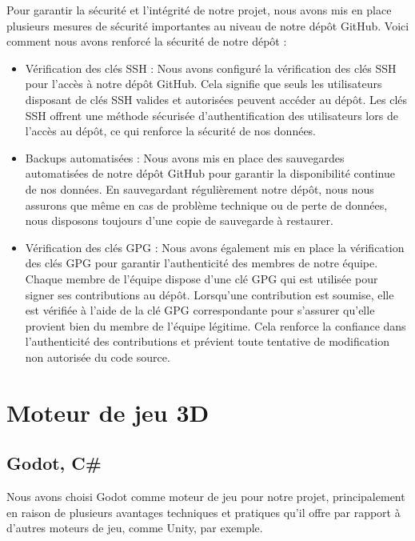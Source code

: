 \documentclass[
	article,			%
	11pt,				%
	oneside,			%
	a4paper,			%
	chapter=TITLE,
	french,			%
	sumario=tradicional
	]{base_nt}
\begin{document}
Pour garantir la sécurité et l'intégrité de notre projet, nous avons mis en place plusieurs mesures de sécurité importantes au niveau de notre dépôt GitHub. Voici comment nous avons renforcé la sécurité de notre dépôt :

\begin{itemize}
    \item Vérification des clés SSH : Nous avons configuré la vérification des clés SSH pour l'accès à notre dépôt GitHub. Cela signifie que seuls les utilisateurs disposant de clés SSH valides et autorisées peuvent accéder au dépôt. Les clés SSH offrent une méthode sécurisée d'authentification des utilisateurs lors de l'accès au dépôt, ce qui renforce la sécurité de nos données.
    \item Backups automatisées : Nous avons mis en place des sauvegardes automatisées de notre dépôt GitHub pour garantir la disponibilité continue de nos données. En sauvegardant régulièrement notre dépôt, nous nous assurons que même en cas de problème technique ou de perte de données, nous disposons toujours d'une copie de sauvegarde à restaurer.
    \item Vérification des clés GPG : Nous avons également mis en place la vérification des clés GPG pour garantir l'authenticité des membres de notre équipe. Chaque membre de l'équipe dispose d'une clé GPG qui est utilisée pour signer ses contributions au dépôt. Lorsqu'une contribution est soumise, elle est vérifiée à l'aide de la clé GPG correspondante pour s'assurer qu'elle provient bien du membre de l'équipe légitime. Cela renforce la confiance dans l'authenticité des contributions et prévient toute tentative de modification non autorisée du code source.
\end{itemize}

\newpage

\section{Moteur de jeu 3D}

\subsection{Godot, C\#}

Nous avons choisi Godot comme moteur de jeu pour notre projet, principalement en raison de plusieurs avantages techniques et pratiques qu'il offre par rapport à d'autres moteurs de jeu, comme Unity, par exemple.
\end{document}
